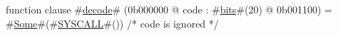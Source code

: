 function clause #\hyperref[zdecode]{decode}# (0b000000 @ code : #\hyperref[zbits]{bits}#(20) @ 0b001100) =
  #\hyperref[zSome]{Some}#(#\hyperref[zSYSCALL]{SYSCALL}#()) /* code is ignored */
